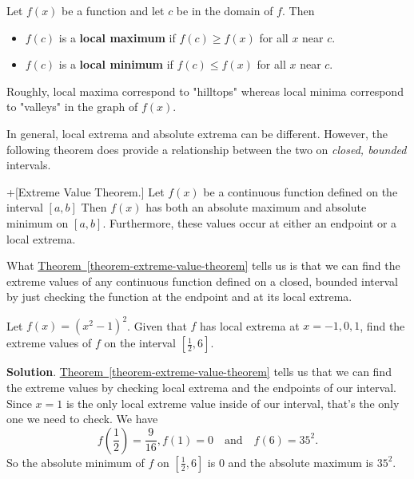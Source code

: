 \documentclass[10pt,]{book}
\newcommand{\terminology}[1]{\textbf{#1}}
\theoremstyle{ptxplainnotitle}
\theoremstyle{ptxplaintitle}
\theoremstyle{ptxplainnotitle}
\theoremstyle{ptxplaintitle}
\theoremstyle{ptxplainnotitle}
\theoremstyle{ptxplaintitle}
\theoremstyle{ptxdefinitionnotitle}
\theoremstyle{ptxdefinitiontitle}
\theoremstyle{ptxdefinitionnotitle}
\theoremstyle{ptxdefinitiontitle}
\theoremstyle{ptxdefinitionnotitle}
\theoremstyle{ptxdefinitiontitle}
\theoremstyle{ptxdefinitionnotitle}
\theoremstyle{ptxdefinitiontitle}
\theoremstyle{ptxdefinitionnotitle}
\theoremstyle{ptxdefinitiontitle}
\numberwithin{equation}{section}
\begin{document}
\begin{definition}\label{definition-local-extrema}
\hypertarget{p-313}{}%
Let \(f(x)\) be a function and let \(c\) be in the domain of \(f\). Then \leavevmode%
\begin{itemize}[label=\textbullet]
\item{}\(f(c)\) is a \terminology{local maximum} if \(f(c)\geq f(x)\) for all \(x\) near \(c\).%
\item{}\(f(c)\) is a \terminology{local minimum} if \(f(c)\leq f(x)\) for all \(x\) near \(c\).%
\end{itemize}
 Roughly, local maxima correspond to "hilltops" whereas local minima correspond to "valleys" in the graph of \(f(x)\).%
\end{definition}
\hypertarget{p-314}{}%
In general, local extrema and absolute extrema can be different. However, the following theorem does provide a relationship between the two on \emph{closed, bounded} intervals.%
\begin{theorem}+[{Extreme Value Theorem.}]\label{theorem-extreme-value-theorem}
\hypertarget{p-315}{}%
Let \(f(x)\) be a continuous function defined on the interval \([a,b]\) Then \(f(x)\) has both an absolute maximum and absolute minimum on \([a,b]\). Furthermore, these values occur at either an endpoint or a local extrema.%
\end{theorem}
\hypertarget{p-316}{}%
What \hyperref[theorem-extreme-value-theorem]{Theorem~\ref{theorem-extreme-value-theorem}} tells us is that we can find the extreme values of any continuous function defined on a closed, bounded interval by just checking the function at the endpoint and at its local extrema.%
\begin{example}\label{example-finding-extreme-values}
\hypertarget{p-317}{}%
Let \(f(x) = (x^{2}-1)^{2}\). Given that \(f\) has local extrema at \(x=-1,0,1\), find the extreme values of \(f\) on the interval \([\frac{1}{2},6]\).%
\par\smallskip%
\noindent\textbf{Solution}.\hypertarget{solution-70}{}\quad%
\hypertarget{p-318}{}%
\hyperref[theorem-extreme-value-theorem]{Theorem~\ref{theorem-extreme-value-theorem}} tells us that we can find the extreme values by checking local extrema and the endpoints of our interval. Since \(x=1\) is the only local extreme value inside of our interval, that's the only one we need to check. We have%
\begin{equation*}
f(\frac{1}{2}) = \frac{9}{16}, f(1) = 0\quad\text{and}\quad f(6) = 35^{2}.
\end{equation*}
So the absolute minimum of \(f\) on \([\frac{1}{2},6]\) is \(0\) and the absolute maximum is \(35^{2}.\)%
\end{example}
\end{document}
